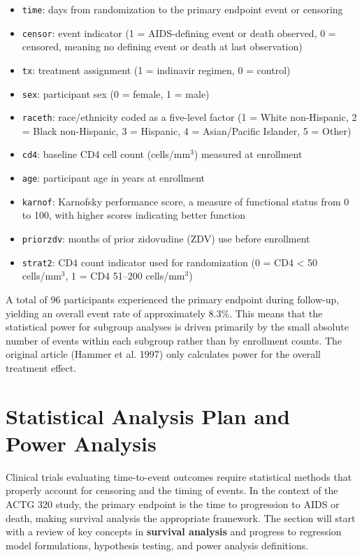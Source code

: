 \documentclass[
  letterpaper,
  DIV=11,
  numbers=noendperiod]{scrartcl}
\providecommand{\tightlist}{%
  \setlength{\itemsep}{0pt}\setlength{\parskip}{0pt}}\usepackage{longtable,booktabs,array}
\begin{document}
\begin{itemize}
\tightlist
\item
  \texttt{time}: days from randomization to the primary endpoint event
  or censoring
\item
  \texttt{censor}: event indicator (1 = AIDS-defining event or death
  observed, 0 = censored, meaning no defining event or death at last
  observation)
\item
  \texttt{tx}: treatment assignment (1 = indinavir regimen, 0 = control)
\item
  \texttt{sex}: participant sex (0 = female, 1 = male)
\item
  \texttt{raceth}: race/ethnicity coded as a five-level factor (1 =
  White non-Hispanic, 2 = Black non-Hispanic, 3 = Hispanic, 4 =
  Asian/Pacific Islander, 5 = Other)
\item
  \texttt{cd4}: baseline CD4 cell count (cells/mm\(^3\)) measured at
  enrollment
\item
  \texttt{age}: participant age in years at enrollment
\item
  \texttt{karnof}: Karnofsky performance score, a measure of functional
  status from 0 to 100, with higher scores indicating better function
\item
  \texttt{priorzdv}: months of prior zidovudine (ZDV) use before
  enrollment
\item
  \texttt{strat2}: CD4 count indicator used for randomization (0 = CD4
  \textless{} 50 cells/mm\(^3\), 1 = CD4 51--200 cells/mm\(^3\))
\end{itemize}

A total of 96 participants experienced the primary endpoint during
follow-up, yielding an overall event rate of approximately 8.3\%. This
means that the statistical power for subgroup analyses is driven
primarily by the small absolute number of events within each subgroup
rather than by enrollment counts. The original article (Hammer et al.
1997) only calculates power for the overall treatment effect.

\section{Statistical Analysis Plan and Power
Analysis}\label{sec-methods}

Clinical trials evaluating time-to-event outcomes require statistical
methods that properly account for censoring and the timing of events. In
the context of the ACTG 320 study, the primary endpoint is the time to
progression to AIDS or death, making survival analysis the appropriate
framework. The section will start with a review of key concepts in
\textbf{survival analysis} and progress to regression model
formulations, hypothesis testing, and power analysis definitions.
\end{document}
